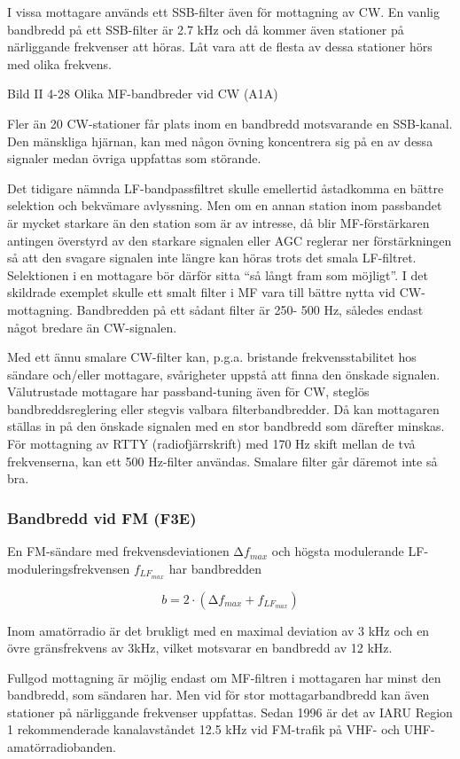I vissa mottagare används ett SSB-filter även för mottagning av CW. En
vanlig bandbredd på ett SSB-filter är 2.7 kHz och då kommer även
stationer på närliggande frekvenser att höras. Låt vara att de flesta
av dessa stationer hörs med olika frekvens.

Bild II 4-28 Olika MF-bandbreder vid CW (A1A)

Fler än 20 CW-stationer får plats inom en bandbredd motsvarande en
SSB-kanal. Den mänskliga hjärnan, kan med någon övning koncentrera sig
på en av dessa signaler medan övriga uppfattas som störande.

Det tidigare nämnda LF-bandpassfiltret skulle emellertid åstadkomma en
bättre selektion och bekvämare avlyssning. Men om en annan station
inom passbandet är mycket starkare än den station som är av intresse,
då blir MF-förstärkaren antingen överstyrd av den starkare signalen
eller AGC reglerar ner förstärkningen så att den svagare signalen inte
längre kan höras trots det smala LF-filtret. Selektionen i en
mottagare bör därför sitta ``så långt fram som möjligt''. I det
skildrade exemplet skulle ett smalt filter i MF vara till bättre nytta
vid CW-mottagning. Bandbredden på ett sådant filter är 250- 500 Hz,
således endast något bredare än CW-signalen.

Med ett ännu smalare CW-filter kan, p.g.a. bristande
frekvensstabilitet hos sändare och/eller mottagare, svårigheter
uppstå att finna den önskade signalen. Välutrustade mottagare har
passband-tuning även för CW, steglös bandbreddsreglering eller stegvis
valbara filterbandbredder. Då kan mottagaren ställas in på den önskade
signalen med en stor bandbredd som därefter minskas.  För mottagning
av RTTY (radiofjärrskrift) med 170 Hz skift mellan de två
frekvenserna, kan ett 500 Hz-filter användas. Smalare filter går
däremot inte så bra.

\subsubsection{Bandbredd vid FM (F3E)}
En FM-sändare med frekvensdeviationen \(∆f_{max}\) och högsta
modulerande LF-moduleringsfrekvensen \(f_{LF_{max}}\) har bandbredden

\[ b = 2 \cdot (∆f_{max} + f_{LF_{max}}) \]

Inom amatörradio är det brukligt med en maximal deviation av 3 kHz och
en övre gränsfrekvens av 3kHz, vilket motsvarar en bandbredd av 12
kHz.

Fullgod mottagning är möjlig endast om MF-filtren i mottagaren har
minst den bandbredd, som sändaren har. Men vid för stor
mottagarbandbredd kan även stationer på närliggande frekvenser
uppfattas. Sedan 1996 är det av IARU Region 1 rekommenderade
kanalavståndet 12.5 kHz vid FM-trafik på VHF- och
UHF-amatörradiobanden.

